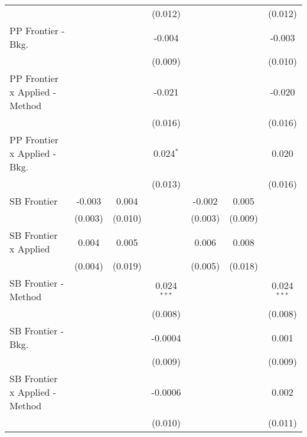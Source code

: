 \begin{tabular}{lcccccc}
                                  &               &         & (0.012)       &              &         & (0.012)\\   
   PP Frontier - Bkg.             &               &         & -0.004        &              &         & -0.003\\   
                                  &               &         & (0.009)       &              &         & (0.010)\\   
   PP Frontier x Applied - Method &               &         & -0.021        &              &         & -0.020\\   
                                  &               &         & (0.016)       &              &         & (0.016)\\   
   PP Frontier x Applied - Bkg.   &               &         & 0.024$^{*}$   &              &         & 0.020\\   
                                  &               &         & (0.013)       &              &         & (0.016)\\   
   SB Frontier                    & -0.003        & 0.004   &               & -0.002       & 0.005   &   \\   
                                  & (0.003)       & (0.010) &               & (0.003)      & (0.009) &   \\   
   SB Frontier x Applied          & 0.004         & 0.005   &               & 0.006        & 0.008   &   \\   
                                  & (0.004)       & (0.019) &               & (0.005)      & (0.018) &   \\   
   SB Frontier - Method           &               &         & 0.024$^{***}$ &              &         & 0.024$^{***}$\\   
                                  &               &         & (0.008)       &              &         & (0.008)\\   
   SB Frontier - Bkg.             &               &         & -0.0004       &              &         & 0.001\\   
                                  &               &         & (0.009)       &              &         & (0.009)\\   
   SB Frontier x Applied - Method &               &         & -0.0006       &              &         & 0.002\\   
                                  &               &         & (0.010)       &              &         & (0.011)\\   

\end{tabular}
